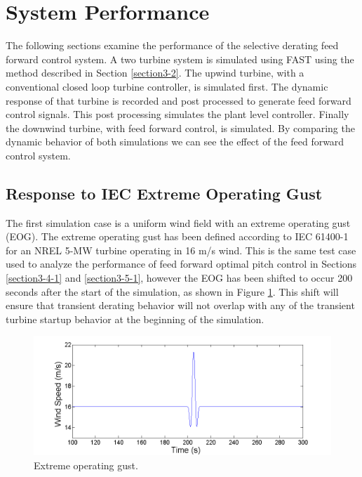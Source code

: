 
\section{System Performance} \label{section4-6}

The following sections examine the performance of the selective derating feed forward control system. A two turbine system is simulated using FAST using the method described in Section \ref{section3-2}. The upwind turbine, with a conventional closed loop turbine controller,  is simulated first. The dynamic response of that turbine is recorded and post processed to generate feed forward control signals. This post processing simulates the plant level controller. Finally the downwind turbine, with feed forward control, is simulated. By comparing the dynamic behavior of both simulations we can see the effect of the feed forward control system.

\subsection{Response to IEC Extreme Operating Gust} \label{section4-6-1}

The first simulation case is a uniform wind field with an extreme operating gust (EOG). The extreme operating gust has been defined according to IEC 61400-1 \cite{IEC2005} for an NREL 5-MW turbine operating in 16 m/s wind. This is the same test case used to analyze the performance of feed forward optimal pitch control in Sections \ref{section3-4-1} and \ref{section3-5-1}, however the EOG has been shifted to occur 200 seconds after the start of the simulation, as shown in Figure \ref{fig4-22}. This shift will ensure that transient derating behavior will not overlap with any of the transient turbine startup  behavior at the beginning of the simulation.

\begin{figure}[htbp]
	\centering
		\includegraphics[trim = {1cm 0 2cm 0}, clip, width = \linewidth]{Figures/ch4Figures/fig4-22.png}
		
	\caption{Extreme operating gust.}
	\label{fig4-22}
\end{figure}

